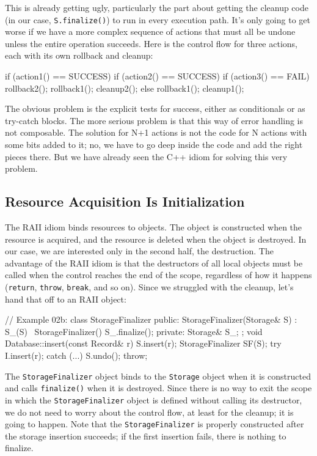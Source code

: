 This is already getting ugly, particularly the part about getting the cleanup code (in our case, \texttt{S.finalize()}) to run in every execution path. It's only going to get worse if we have a more complex sequence of actions that must all be undone unless the entire operation succeeds. Here is the control flow for three actions, each with its own rollback and cleanup:

\begin{code}
if (action1() == SUCCESS) {
  if (action2() == SUCCESS) {
    if (action3() == FAIL) {
      rollback2();
      rollback1();
    }
    cleanup2();
  } else {
    rollback1();
  }
  cleanup1();
}
\end{code}

The obvious problem is the explicit tests for success, either as conditionals or as try-catch blocks. The more serious problem is that this way of error handling is not composable. The solution for N+1 actions is not the code for N actions with some bits added to it; no, we have to go deep inside the code and add the right pieces there. But we have already seen the C++ idiom for solving this very problem.

\subsection{Resource Acquisition Is Initialization}

The RAII idiom binds resources to objects. The object is constructed when the resource is acquired, and the resource is deleted when the object is destroyed. In our case, we are interested only in the second half, the destruction. The advantage of the RAII idiom is that the destructors of all local objects must be called when the control reaches the end of the scope, regardless of how it happens (\texttt{return}, \texttt{throw}, \texttt{break}, and so on). Since we struggled with the cleanup, let's hand that off to an RAII object:

\begin{code}
// Example 02b:
class StorageFinalizer {
  public:
  StorageFinalizer(Storage& S) : S_(S) {}
  ~StorageFinalizer() { S_.finalize(); }
  private:
  Storage& S_;
};
void Database::insert(const Record& r) {
  S.insert(r);
  StorageFinalizer SF(S);
  try {
    I.insert(r);
  } catch (...) {
    S.undo();
    throw;
  }
}
\end{code}

The \texttt{StorageFinalizer} object binds to the \texttt{Storage} object when it is constructed and calls \texttt{finalize()} when it is destroyed. Since there is no way to exit the scope in which the \texttt{StorageFinalizer} object is defined without calling its destructor, we do not need to worry about the control flow, at least for the cleanup; it is going to happen. Note that the \texttt{StorageFinalizer} is properly constructed after the storage insertion succeeds; if the first insertion fails, there is nothing to finalize.

